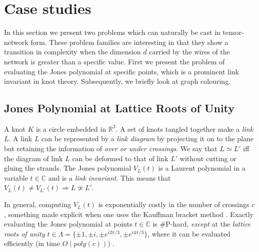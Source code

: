 \section{Case studies}

In this section we present two problems which can naturally be cast in tensor-network form.
These problem families are interesting in that they show a transition in complexity when the dimension $d$ carried by the wires of the network is greater than a specific value.
First we present the problem of evaluating the Jones polynomial at specific points, which is a prominent link invariant in knot theory.
Subsequently, we briefly look at graph colouring.

\subsection{Jones Polynomial at Lattice Roots of Unity}


A knot $K$ is a circle embedded in $\mathbb{R}^3$.
A set of knots tangled together make a \emph{link} $L$.
A link $L$ can be represented by a \emph{link diagram}
by projecting it on to the plane
but retaining the information of \emph{over or under crossings}.
We say that $L\simeq L'$ iff the diagram of link $L$ can be deformed to that of link $L'$ without cutting or gluing the strands.
The Jones polynomial $V_L(t)$
is a Laurent polynomial in a variable $t\in\mathbb{C}$
and is a \emph{link invariant}.
This means that
$V_L(t)\neq V_{L'}(t)\Rightarrow L\not\simeq L'$.

In general, computing $V_L(t)$
is exponentially costly in the number of crossings $c$,
something made explicit when one uses the Kauffman bracket method \cite{Kauffman2001}.
Exactly evaluating the Jones polynomial at points $t\in\mathbb{C}$ is \#P-hard,
\emph{except} at the \emph{lattice roots of unity} $t\in\Lambda = \{ \pm 1, \pm i, \pm e^{i 2\pi/3}, \pm e^{i 4\pi/3} \}$,
where it can be evaluated efficiently (in time $O(poly(c))$) \cite{jaeger_vertigan_welsh_1990}.



